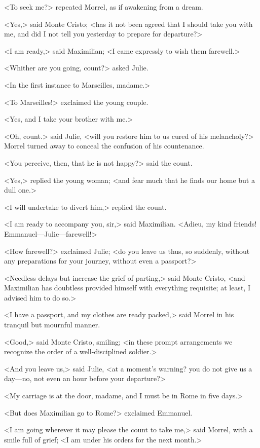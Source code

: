  <To seek me?> repeated Morrel, as if awakening from a dream. 

 <Yes,> said Monte Cristo; <has it not been agreed that I should take you with me, and did I not tell you yesterday to prepare for departure?> 

 <I am ready,> said Maximilian; <I came expressly to wish them farewell.> 

 <Whither are you going, count?> asked Julie. 

 <In the first instance to Marseilles, madame.> 

 <To Marseilles!> exclaimed the young couple. 

 <Yes, and I take your brother with me.> 

 <Oh, count.> said Julie, <will you restore him to us cured of his melancholy?> Morrel turned away to conceal the confusion of his countenance. 

 <You perceive, then, that he is not happy?> said the count. 

 <Yes,> replied the young woman; <and fear much that he finds our home but a dull one.> 

 <I will undertake to divert him,> replied the count. 

 <I am ready to accompany you, sir,> said Maximilian. <Adieu, my kind friends! Emmanuel—Julie—farewell!> 

 <How farewell?> exclaimed Julie; <do you leave us thus, so suddenly, without any preparations for your journey, without even a passport?> 

 <Needless delays but increase the grief of parting,> said Monte Cristo, <and Maximilian has doubtless provided himself with everything requisite; at least, I advised him to do so.> 

 <I have a passport, and my clothes are ready packed,> said Morrel in his tranquil but mournful manner. 

 <Good,> said Monte Cristo, smiling; <in these prompt arrangements we recognize the order of a well-disciplined soldier.> 

 <And you leave us,> said Julie, <at a moment's warning? you do not give us a day—no, not even an hour before your departure?> 

 <My carriage is at the door, madame, and I must be in Rome in five days.> 

 <But does Maximilian go to Rome?> exclaimed Emmanuel. 

 <I am going wherever it may please the count to take me,> said Morrel, with a smile full of grief; <I am under his orders for the next month.> 

